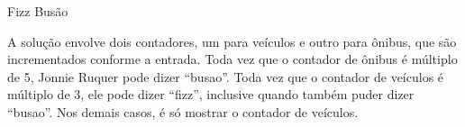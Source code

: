 \begin{tutorial}{Fizz Busão}

A solução envolve dois contadores, um para veículos e outro para ônibus, que são incrementados conforme a entrada. Toda vez que o contador de ônibus é múltiplo de 5, Jonnie Ruquer pode dizer ``busao''. Toda vez que o contador de veículos é múltiplo de 3, ele pode dizer ``fizz'', inclusive quando também puder dizer ``busao''. Nos demais casos, é só mostrar o contador de veículos.

\end{tutorial}
